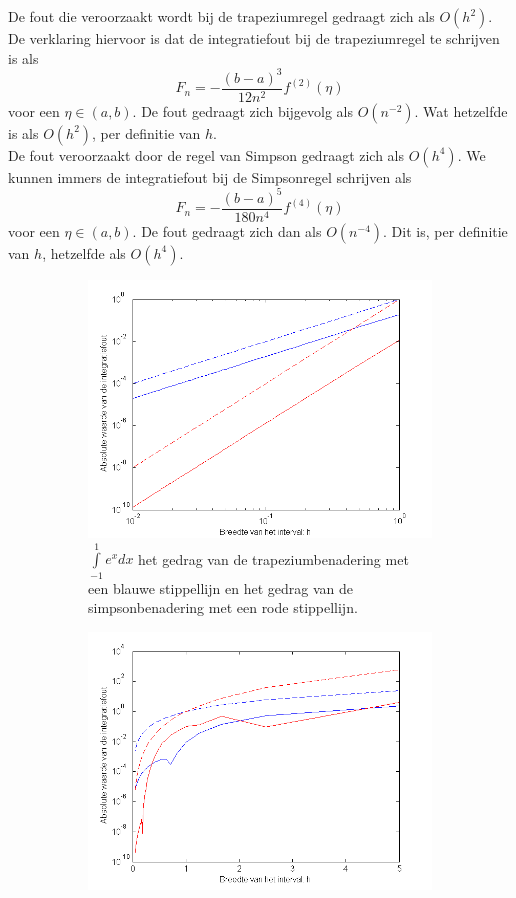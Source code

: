\documentclass[11pt,a4paper]{article}
\begin{document}
De fout die veroorzaakt wordt bij de trapeziumregel gedraagt zich als $O(h^2)$. De verklaring hiervoor is dat de integratiefout bij de trapeziumregel te schrijven is als \[ F_n = -\dfrac{(b-a)^3}{12n^2}f^{(2)}(\eta) \] voor een $\eta \in (a,b)$. De fout gedraagt zich bijgevolg als $O(n^{-2})$. Wat hetzelfde is als $O(h^2)$, per definitie van $h$.
\\
De fout veroorzaakt door de regel van Simpson gedraagt zich als $O(h^4)$. We kunnen immers de integratiefout bij de Simpsonregel schrijven als \[ F_n = -\dfrac{(b-a)^5}{180n^4}f^{(4)}(\eta) \] voor een $\eta \in (a,b)$. De fout gedraagt zich dan als $O(n^{-4})$. Dit is, per definitie van $h$, hetzelfde als $O(h^4)$.
\vspace{-45pt}
\begin{figure}[H]
	\begin{subfigure}{0.5\textwidth}
	\includegraphics[width=\textwidth]{11b1.png}
	\caption*{$\int\limits_{-1}^1e^xdx$ het gedrag van de trapeziumbenadering met een blauwe stippellijn en het gedrag van de simpsonbenadering met een rode stippellijn.}
	\end{subfigure}
	\hspace{10pt}
	\begin{subfigure}{0.5\textwidth}
	\includegraphics[width=\textwidth]{11b2.png}

\end{subfigure}
\end{figure}
\end{document}
